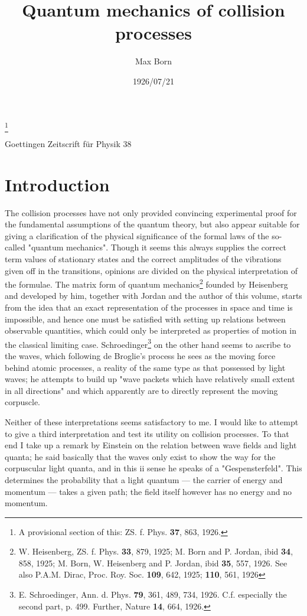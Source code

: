 \documentclass[a4paper,11pt]{article}
\newcommand{\location}[1]{#1}
\newcommand{\publication}[1]{#1}
\newcommand{\textbb}[1]{\textbf{#1}}
\newcommand{\?}[2]{#1\footnote{\textsc{Translator note}: #2}}
\begin{document}
\title{Quantum mechanics of collision processes}
\footnote{A provisional section of this: ZS. f. Phys. \textbb{37}, 863, 1926.}

\author{Max Born}
\location{Goettingen}
\publication{Zeitscrift für Physik 38}
\date{1926/07/21}


\section*{Introduction} The collision processes have not only provided convincing experimental proof for the fundamental assumptions of the quantum theory, but also appear suitable for giving a clarification of the physical significance of the formal laws of the so-called "quantum mechanics". Though it seems this always supplies the correct term values of stationary states and the correct amplitudes of the vibrations given off in the transitions, opinions are divided on the physical interpretation of the formulae. The matrix form of quantum mechanics\footnote{W. Heisenberg, ZS. f. Phys. \textbb{33}, 879, 1925; M. Born and P. Jordan, ibid \textbb{34}, 858, 1925; M. Born, W. Heisenberg and P. Jordan, ibid \textbb{35}, 557, 1926. See also P.A.M. Dirac, Proc. Roy. Soc. \textbb{109}, 642, 1925; \textbf{110}, 561, 1926} founded by Heisenberg and developed by him, together with Jordan and the author of this volume, starts from the idea that an exact representation  of the processes in space and time is impossible, and hence one must be satisfied with setting up relations between observable quantities, which could only be interpreted as properties of motion in the classical limiting case. Schroedinger\footnote{E. Schroedinger, Ann. d. Phys. \textbb{79}, 361, 489, 734, 1926. C.f. especially the second part, p. 499. Further, Nature \textbb{14}, 664, 1926.} on the other hand seems to ascribe to the waves, which following de Broglie's process he sees as the moving force behind atomic processes, a reality of the same type as that possessed by light waves; he attempts to build up "wave packets which have relatively small extent in all directions" and which apparently are to directly represent the moving corpuscle.

Neither of these interpretations seems satisfactory to me. I would like to attempt to give a third interpretation and test its utility on collision processes. To that end I take up a remark by Einstein on the relation between wave fields and light quanta; he said basically that the waves only exist to show the way for the corpuscular light quanta, and in this ii sense he speaks of a "Gespensterfeld". This determines the probability that a light quantum — the carrier of energy and momentum — takes a given path; the field itself however has no energy and no momentum.
\end{document}
